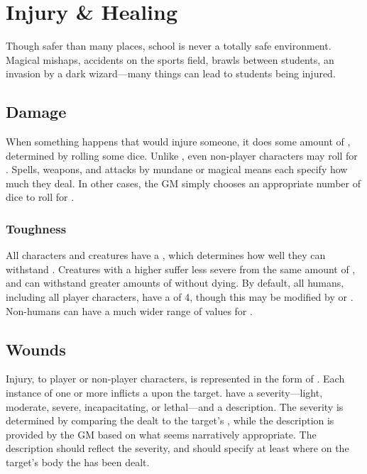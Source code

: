 \section{Injury \& Healing}

Though safer than many places, school is never a totally safe environment.
Magical mishaps, accidents on the sports field, brawls between students, an invasion by a dark wizard---many things can lead to students being injured.

\subsection{Damage}

When something happens that would injure someone, it does some amount of {\damage}, determined by rolling some dice.
Unlike {\tests}, even non-player characters may roll for {\damage}.
Spells, weapons, and attacks by mundane or magical means each specify how much {\damage} they deal.
In other cases, the GM simply chooses an appropriate number of dice to roll for {\damage}.

\subsubsection{Toughness}

All characters and creatures have a {\toughness}, which determines how well they can withstand {\damage}.
Creatures with a higher {\toughness} suffer less severe {\wounds} from the same amount of {\damage}, and can withstand greater amounts of {\damage} without dying.
By default, all humans, including all player characters, have a {\toughness} of 4, though this may be modified by {\virtues} or {\flaws}.
Non-humans can have a much wider range of values for {\toughness}.

\subsection{Wounds}

Injury, to player or non-player characters, is represented in the form of {\wounds}.
Each instance of one or more {\damage} inflicts a {\wound} upon the target.
\capital{\wounds} have a severity---light, moderate, severe, incapacitating, or lethal---and a description.
The severity is determined by comparing the {\damage} dealt to the target's {\toughness}, while the description is provided by the GM based on what seems narratively appropriate.
The description should reflect the severity, and should specify at least where on the target's body the {\wound} has been dealt.

